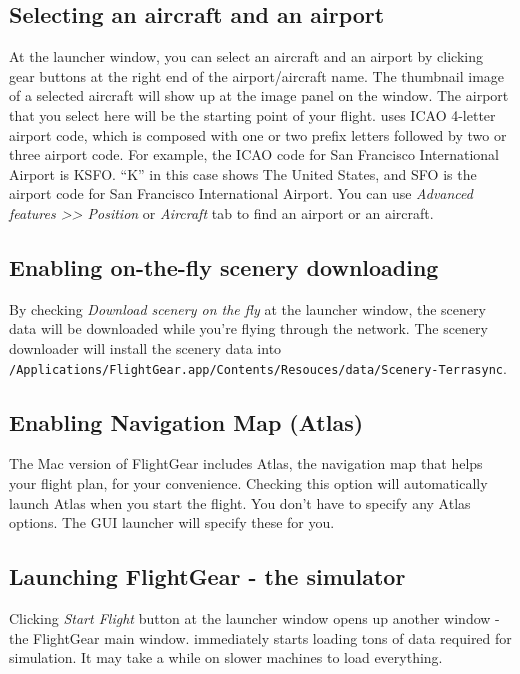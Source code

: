 \medskip

\subsection{Selecting an aircraft and an airport}
At the launcher window, you can select an aircraft and an airport by clicking gear buttons at the right end of the airport/aircraft name. The thumbnail image of a selected aircraft will show up at the image panel on the window. The airport that you select here will be the starting point of your flight. \FlightGear{} uses ICAO 4-letter airport code, which is composed with one or two prefix letters followed by two or three airport code. For example, the ICAO code for San Francisco International Airport is KSFO. ``K'' in this case shows The United States, and SFO is the airport code for San Francisco International Airport. You can use \textit{Advanced features >> Position} or \textit{Aircraft} tab to find an airport or an aircraft.

\subsection{Enabling on-the-fly scenery downloading}
By checking \textit{Download scenery on the fly} at the launcher window, the scenery data will be downloaded while you're flying through the network. The scenery downloader will install the scenery data into \\
\texttt{/Applications/FlightGear.app/Contents/Resouces/data/Scenery-Terrasync}. 

\subsection{Enabling Navigation Map (Atlas)}
The Mac version of FlightGear includes Atlas, the navigation map that helps your flight plan, for your convenience. Checking this option will automatically launch Atlas when you start the flight. You don't have to specify any Atlas options. The GUI launcher will specify these for you.

\subsection{Launching FlightGear - the simulator}
Clicking \textit{Start Flight} button at the launcher window opens up another window - the FlightGear main window. \FlightGear{} immediately starts loading tons of data required for simulation. It may take a while on slower machines to load everything.


